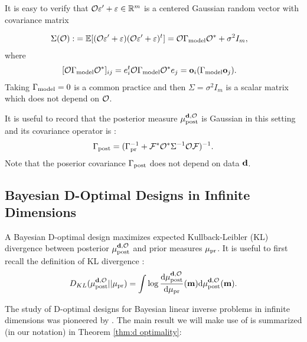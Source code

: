 It is easy to verify that $\mathcal{O} \varepsilon' + \varepsilon \in \mathbb{R}^m$ is a centered
Gaussian random vector with covariance matrix

\begin{align}\label{eq:Sigma}
  \begin{split}
    \Sigma(\mathcal{O}) :&= \mathbb{E}[ (\mathcal{O} \varepsilon' + \varepsilon) (\mathcal{O} \varepsilon' +
      \varepsilon)^t ]
    = \mathcal{O} \Gamma_{\textup{model}} \mathcal{O}^* + \sigma^2I_m , 
  \end{split}
\end{align}
where
\begin{align}\label{eq:modcov explained}
  \begin{split}
    [\obs \modcov \obs^*]_{ij} & = e_i^t \obs \modcov \obs^* e_j 
    = \meas_i (\modcov \meas_j).%
  \end{split}
\end{align}
Taking $\Gamma_{\textup{model}} = 0$ is a common practice
\cite{tarantola2005,Kaipio2005,Vogel02} and then $\Sigma =
\sigma^2I_m$ is a scalar matrix which does not depend on $\mathcal{O}$.

It is useful to record that the posterior measure $\mu_{\textup{post}}^{\mathbf{d}, \mathcal{O}}$ is Gaussian
in this setting and its covariance operator is \cite{Stuart10}:
\begin{align}\label{eq:postcov}
  \Gamma_{\textup{post}} = (\Gamma_{\textup{pr}}^{-1} + \mathcal{F}^* \mathcal{O}^* \Sigma^{-1} \mathcal{O} \mathcal{F}
  )^{-1}.
\end{align}
Note that the poserior covariance $\Gamma_{\textup{post}}$ does not depend on data
$\mathbf{d}$.

\subsection{Bayesian D-Optimal Designs in Infinite Dimensions}\label{subsec:D optimal design} 
A Bayesian D-optimal design maximizes expected Kullback-Leibler (KL)
divergence between posterior $\mu_{\textup{post}}^{\mathbf{d}, \mathcal{O}}$ and prior measures $\mu_{\textup{pr}}$. It is
useful to first recall the definition of KL divergence \cite{CoverThomas91}:
$$
D_{KL}(\mu_{\textup{post}}^{\mathbf{d}, \mathcal{O}}||\mu_{\textup{pr}}) = \int \log \frac{\text{\textup{d}} \mu_{\textup{post}}^{\mathbf{d}, \mathcal{O}}}{\text{\textup{d}} \mu_{\textup{pr}}}(\mathbf{m}) \text{\textup{d}} \mu_{\textup{post}}^{\mathbf{d}, \mathcal{O}}(\mathbf{m}).
$$

The study of D-optimal designs for Bayesian linear inverse problems in
infinite dimensions was pioneered by \cite{AlexanderianGloorGhattas14,
  alexanderian2018efficient}. The main result we will make use of is
summarized (in our notation) in Theorem \ref{thm:d optimality}:

